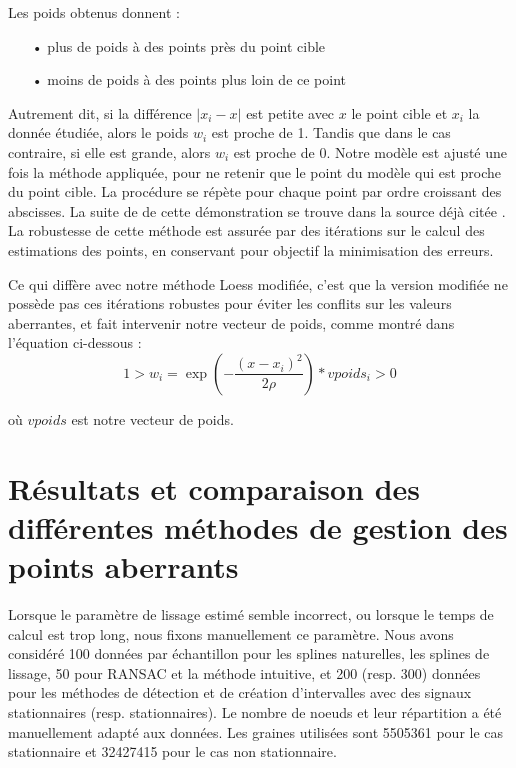 \documentclass[a4paper,12pt]{article} %
\begin{document}
                 
                    
                    Les poids obtenus donnent :
                    \begin{itemize}
                        \item[•] plus de poids à des points près du point cible
                        \item[•] moins de poids à des points plus loin de ce point
                    \end{itemize}
                    Autrement dit, si la différence $| x_i - x |$ est petite avec $x$ le point cible et $x_i$ la donnée étudiée, alors le poids $w_i$ est proche de 1. Tandis que dans le cas contraire, si elle est grande, alors $w_i$ est proche de 0. 
                    Notre modèle est ajusté une fois la méthode appliquée, pour ne retenir que le point du modèle qui est proche du point cible. La procédure se répète pour chaque point par ordre croissant des abscisses.
                    La suite de de cette démonstration se trouve dans la source déjà citée \cite{LOESS1}.\\
                    
                    La robustesse de cette méthode est assurée par des itérations sur le calcul des estimations des points, en conservant pour objectif la minimisation des erreurs.
                    
                    
                    Ce qui diffère avec notre méthode Loess modifiée, c'est que la version modifiée ne possède pas ces itérations robustes pour éviter les conflits sur les valeurs aberrantes, et fait intervenir notre vecteur de poids, comme montré dans l'équation ci-dessous :
                    \[1 > w_i = \exp \left( - \frac{(x -x_i)^2}{2 \rho} \right)*vpoids_i > 0\] 
                    
                    où $vpoids$ est notre vecteur de poids.

                    
                    
                    

\renewcommand\partname{}
\part{Résultats et comparaison des différentes méthodes de gestion des points aberrants}
    
    Lorsque le paramètre de lissage estimé semble incorrect, ou lorsque le temps de calcul est trop long, nous fixons manuellement ce paramètre. Nous avons considéré 100 données par échantillon pour les splines naturelles, les splines de lissage, 50 pour RANSAC et la méthode intuitive, et 200 (resp. 300) données pour les méthodes de détection et de création d'intervalles avec des signaux stationnaires (resp. stationnaires). Le nombre de noeuds et leur répartition a été manuellement adapté aux données. Les graines utilisées sont 5505361 pour le cas stationnaire et 32427415 pour le cas non stationnaire.\\
    
\end{document}
